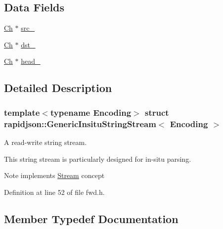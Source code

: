 \subsection*{Data Fields}
\begin{DoxyCompactItemize}
\item 
\mbox{\hyperlink{structrapidjson_1_1_generic_insitu_string_stream_a3a7ed47ee193d1e5f850aa841b743631}{Ch}} $\ast$ \mbox{\hyperlink{structrapidjson_1_1_generic_insitu_string_stream_ae68a80f99fd484704af045a0ccd9c00f}{src\+\_\+}}
\item 
\mbox{\hyperlink{structrapidjson_1_1_generic_insitu_string_stream_a3a7ed47ee193d1e5f850aa841b743631}{Ch}} $\ast$ \mbox{\hyperlink{structrapidjson_1_1_generic_insitu_string_stream_ac6b5cf07cdb691f99abd52a672790d8a}{dst\+\_\+}}
\item 
\mbox{\hyperlink{structrapidjson_1_1_generic_insitu_string_stream_a3a7ed47ee193d1e5f850aa841b743631}{Ch}} $\ast$ \mbox{\hyperlink{structrapidjson_1_1_generic_insitu_string_stream_a6d611d9f5372d457373b90a711dd2717}{head\+\_\+}}
\end{DoxyCompactItemize}


\subsection{Detailed Description}
\subsubsection*{template$<$typename Encoding$>$\newline
struct rapidjson\+::\+Generic\+Insitu\+String\+Stream$<$ Encoding $>$}

A read-\/write string stream. 

This string stream is particularly designed for in-\/situ parsing. \begin{DoxyNote}{Note}
implements \mbox{\hyperlink{classrapidjson_1_1_stream}{Stream}} concept 
\end{DoxyNote}


Definition at line 52 of file fwd.\+h.



\subsection{Member Typedef Documentation}
\mbox{\label{structrapidjson_1_1_generic_insitu_string_stream_a3a7ed47ee193d1e5f850aa841b743631}} 
